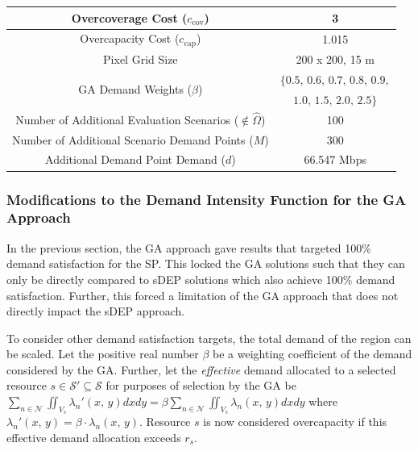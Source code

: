 \documentclass[12pt,dvipsnames]{report}
\begin{document}
\begin{table}[!htp]
\begin{tabular}{|c|c|}
		\hline 
		Overcoverage Cost ($c_\text{cov}$) & 3 \\
		\hline
		Overcapacity Cost ($c_\text{cap}$) & 1.015 \\ 
		\hline
		Pixel Grid Size & 200 x 200, 15 m \\ 
		\hline
		\multirow{2}{*}{GA Demand Weights ($\beta$)} & $\{ 0.5,\, 0.6,\, 0.7,\, 0.8,\, 0.9,$ \\
		& $1.0,\, 1.5,\, 2.0,\, 2.5 \}$ \\
		\hline
		\hline
		Number of Additional Evaluation Scenarios ($\not\in \hat{\Omega}$) & 100 \\
		\hline
		Number of Additional Scenario Demand Points ($M$) & 300 \\
		\hline
		Additional Demand Point Demand ($d$) & 66.547 Mbps \\
		\hline
	\end{tabular}
	\label{tab:CaseI_SimVal}
\end{table}

\subsubsection{Modifications to the Demand Intensity Function for the GA Approach}

In the previous section, the GA approach gave results that targeted 100\% demand satisfaction for the SP.  This locked the GA solutions such that they can only be directly compared to sDEP solutions which also achieve 100\% demand satisfaction.  Further, this forced a limitation of the GA approach that does not directly impact the sDEP approach.

%
To consider other demand satisfaction targets, the total demand of the region can be scaled.  Let the positive real number $\beta$ be a weighting coefficient of the demand considered by the GA.  Further, let the \emph{effective} demand allocated to a selected resource $s \in \mathcal{S}' \subseteq \mathcal{S}$ for purposes of selection by the GA be $\sum_{n \in \mathcal{N}} \iint_{V_s} \lambda_n'\left( x,\, y \right) dx dy = \beta \sum_{n \in \mathcal{N}} \iint_{V_s} \lambda_n\left( x,\, y \right) dx dy$ where $\lambda_n'\left( x,\, y \right) = \beta \cdot \lambda_n\left( x,\, y \right)$.  Resource $s$ is now considered overcapacity if this effective demand allocation exceeds $r_s$.
\end{document}
